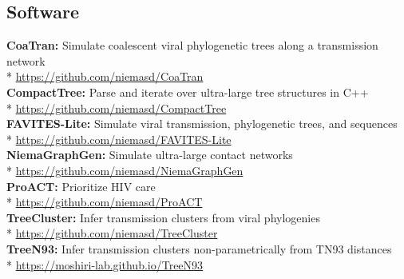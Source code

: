 \documentclass[margin,line]{res}
\begin{document}
\begin{resume}
\section{\sc Software}
\textbf{CoaTran:} Simulate coalescent viral phylogenetic trees along a transmission network\\*\vspace{2mm}
\hspace*{4mm} \href{https://github.com/niemasd/CoaTran}{https://github.com/niemasd/CoaTran}\\
\textbf{CompactTree:} Parse and iterate over ultra-large tree structures in C++\\*\vspace{2mm}
\hspace*{4mm} \href{https://github.com/niemasd/CompactTree}{https://github.com/niemasd/CompactTree}\\
\textbf{FAVITES-Lite:} Simulate viral transmission, phylogenetic trees, and sequences\\*\vspace{2mm}
\hspace*{4mm} \href{https://github.com/niemasd/FAVITES-Lite}{https://github.com/niemasd/FAVITES-Lite}\\
\textbf{NiemaGraphGen:} Simulate ultra-large contact networks\\*\vspace{2mm}
\hspace*{4mm} \href{https://github.com/niemasd/NiemaGraphGen}{https://github.com/niemasd/NiemaGraphGen}\\
\textbf{ProACT:} Prioritize HIV care\\*\vspace{2mm}
\hspace*{4mm} \href{https://github.com/niemasd/ProACT}{https://github.com/niemasd/ProACT}\\
\textbf{TreeCluster:} Infer transmission clusters from viral phylogenies\\*\vspace{2mm}
\hspace*{4mm} \href{https://github.com/niemasd/TreeCluster}{https://github.com/niemasd/TreeCluster}\\
\textbf{TreeN93:} Infer transmission clusters non-parametrically from TN93 distances\\*\vspace{2mm}
\hspace*{4mm} \href{https://moshiri-lab.github.io/TreeN93}{https://moshiri-lab.github.io/TreeN93}\\

\end{resume}
\end{document}
